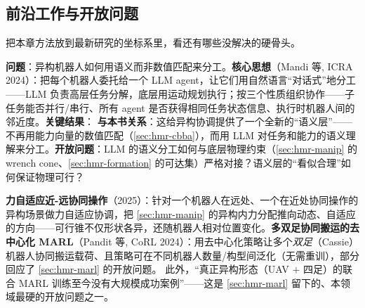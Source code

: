 \subsection{前沿工作与开放问题}
\label{sec:hmr-frontier}
把本章方法放到最新研究的坐标系里，看还有哪些没解决的硬骨头。

\begin{paper}\label{paper:hmr-roco}
\textbf{问题}：异构机器人如何用语义而非数值匹配来分工。\textbf{核心思想}（Mandi 等, ICRA 2024\cite{mandi2024roco}）：把每个机器人委托给一个 LLM agent，让它们用自然语言“对话式”地分工——LLM 负责高层任务分解，底层用运动规划执行；按三个性质组织协作——子任务能否并行/串行、所有 agent 是否获得相同任务状态信息、执行时机器人间的邻近度。\textbf{关键结果}：%
\textbf{与本书关系}：这给异构协调提供了一个全新的“语义层”——不再用能力向量的数值匹配（\cref{sec:hmr-cbba}），而用 LLM 对任务和能力的语义理解来分工。\textbf{开放问题}：LLM 的语义分工如何与底层物理约束（\cref{sec:hmr-manip} 的 wrench cone、\cref{sec:hmr-formation} 的可达集）严格对接？语义层的“看似合理”如何保证物理可行？
\end{paper}

\noindent \textbf{力自适应近-远协同操作}（2025）：针对一个机器人在远处、一个在近处协同操作的异构场景做力自适应协调，把 \cref{sec:hmr-manip} 的异构内力分配推向动态、自适应的方向——可行锥不仅形状各异，还随机器人相对位置变化。\textbf{多双足协同搬运的去中心化 MARL}（Pandit 等, CoRL 2024\cite{pandit2025biped}）：用去中心化策略让多个\emph{双足}（Cassie）机器人协同搬运载荷、且策略可在不同机器人数量/构型间泛化（无需重训），部分回应了 \cref{sec:hmr-marl} 的开放问题。%
此外，“真正异构形态（UAV $+$ 四足）的联合 MARL 训练至今没有大规模成功案例”——这是 \cref{sec:hmr-marl} 留下的、本领域最硬的开放问题之一。

